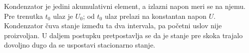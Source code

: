Kondenzator je jedini akumulativni element, a izlazni napon meri se na njemu. Pre trenutka $t_0$ ulaz je $U_0$; od $t_0$ ulaz prelazi na konstantan napon $U$. Kondenzator čuva stanje između ta dva intervala, pa početni uslov nije proizvoljan. U daljem postupku pretpostavlja se da je stanje pre skoka trajalo dovoljno dugo da se uspostavi stacionarno stanje.

